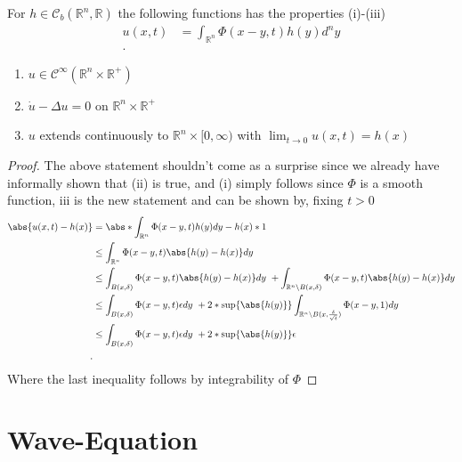 \begin{Theorem}[4.7.]
 For $h \in  \mathcal{C}_b(\mathbb{R}^{n},\mathbb{R} )$  the following functions has the properties (i)-(iii)
 \begin{align*}
   u(x,t) &=  \int_{\mathbb{R}^{n} } \Phi(x-y,t)h(y)d^{n}y  \\
 .\end{align*}
 \begin{enumerate}
   \item $u \in  \mathcal{C}^{\infty}(\mathbb{R}^{n} \times  \mathbb{R}^{+}  ) $
   \item $\dot{u} - \Delta  u = 0 $ on $\mathbb{R}^{n} \times  \mathbb{R}^{+}  $
   \item $u$ extends continuously to $\mathbb{R}^{n} \times  [0,\infty) $ with $\lim_{t\to 0} u(x,t) = h(x)$
 \end{enumerate}
\end{Theorem}
\begin{proof}
 The above statement shouldn't come as a surprise since we already have informally shown that (ii)  is true, and (i) simply follows since 
 $\Phi $ is a smooth function, iii is the new statement and can be shown by, fixing $t>0$
 \begin{align*}
   \abs{u(x,t) - h(x)} &= \abs*{\int_{\mathbb{R}^{n} } \Phi(x-y,t) h(y) dy - h(x)*1}\\
                       &\le  \int_{\mathbb{R}^{n} } \Phi(x-y,t) \abs{h(y)-h(x)} dy \\
                       &\le   \int_{B(x,\delta ) } \Phi(x-y,t) \abs{h(y)-h(x)} dy \ + \int_{\mathbb{R}^{n} \setminus B(x,\delta ) } \Phi(x-y,t) \abs{h(y)-h(x)} dy \\
                       &\le    \int_{B(x,\delta ) } \Phi(x-y,t) \epsilon dy \ + 2*\sup \{\abs{h(y)}\}  \int_{\mathbb{R}^{n} \setminus B(x,\frac{\delta}{\sqrt{t} } ) } \Phi(x-y,1) dy \\
                       &\le    \int_{B(x,\delta ) } \Phi(x-y,t) \epsilon dy \ + 2*\sup \{\abs{h(y)}\}  \epsilon \\
 .\end{align*}
 Where the last inequality follows by integrability of $\Phi $
\end{proof}
\chapter{Wave-Equation}
